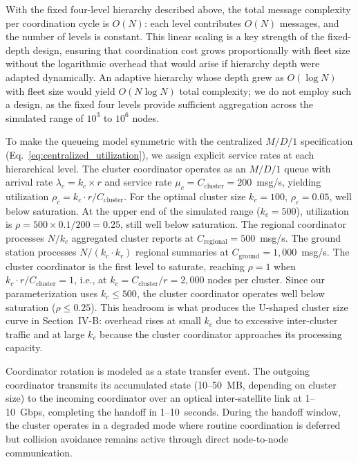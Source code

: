 \documentclass[journal]{IEEEtran}
\begin{document}
With the fixed four-level hierarchy described above, the total message complexity per coordination cycle is $O(N)$: each level contributes $O(N)$ messages, and the number of levels is constant. This linear scaling is a key strength of the fixed-depth design, ensuring that coordination cost grows proportionally with fleet size without the logarithmic overhead that would arise if hierarchy depth were adapted dynamically. An adaptive hierarchy whose depth grew as $O(\log N)$ with fleet size would yield $O(N \log N)$ total complexity; we do not employ such a design, as the fixed four levels provide sufficient aggregation across the simulated range of $10^3$ to $10^6$ nodes.

To make the queueing model symmetric with the centralized $M/D/1$ specification (Eq.~\ref{eq:centralized_utilization}), we assign explicit service rates at each hierarchical level. The cluster coordinator operates as an $M/D/1$ queue with arrival rate $\lambda_c = k_c \times r$ and service rate $\mu_c = C_{\text{cluster}} = 200$~msg/s, yielding utilization $\rho_c = k_c \cdot r / C_{\text{cluster}}$. For the optimal cluster size $k_c = 100$, $\rho_c = 0.05$, well below saturation. At the upper end of the simulated range ($k_c = 500$), utilization is $\rho = 500 \times 0.1 / 200 = 0.25$, still well below saturation. The regional coordinator processes $N/k_c$ aggregated cluster reports at $C_{\text{regional}} = 500$~msg/s. The ground station processes $N/(k_c \cdot k_r)$ regional summaries at $C_{\text{ground}} = 1{,}000$~msg/s. The cluster coordinator is the first level to saturate, reaching $\rho = 1$ when $k_c \cdot r / C_{\text{cluster}} = 1$, i.e., at $k_c = C_{\text{cluster}} / r = 2{,}000$ nodes per cluster. Since our parameterization uses $k_c \leq 500$, the cluster coordinator operates well below saturation ($\rho \leq 0.25$). This headroom is what produces the U-shaped cluster size curve in Section~IV-B: overhead rises at small $k_c$ due to excessive inter-cluster traffic and at large $k_c$ because the cluster coordinator approaches its processing capacity.

Coordinator rotation is modeled as a state transfer event. The outgoing coordinator transmits its accumulated state (10--50~MB, depending on cluster size) to the incoming coordinator over an optical inter-satellite link at 1--10~Gbps, completing the handoff in 1--10~seconds. During the handoff window, the cluster operates in a degraded mode where routine coordination is deferred but collision avoidance remains active through direct node-to-node communication.
\end{document}
